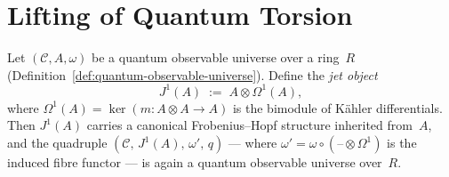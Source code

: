 \chapter{Lifting of Quantum Torsion}
\label{chap:torsion}


\begin{proposition}
\label{prop:jet-prolongation}
Let $(\mathcal{C}, A, \omega)$ be a quantum observable universe over a
ring~$R$ (Definition~\ref{def:quantum-observable-universe}).  Define the
\emph{jet object}
\[
  J^1(A) \;:=\; A \otimes \Omega^1(A),
\]
where $\Omega^1(A) = \ker(m \colon A \otimes A \to A)$ is the bimodule of
K\"ahler differentials.  Then $J^1(A)$ carries a canonical Frobenius--Hopf
structure inherited from~$A$, and the quadruple
$(\mathcal{C},\, J^1(A),\, \omega',\, q)$ --- where
$\omega' = \omega \circ (\text{--} \otimes \Omega^1)$ is the induced fibre
functor --- is again a quantum observable universe over~$R$.
\end{proposition}

